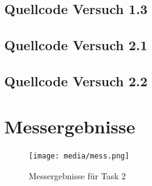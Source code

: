 \documentclass[12pt, oneside, a4paper, \docLanguage]{report}
\begin{document}
\subsection{Quellcode Versuch 1.3}
\label{chap:APPENDIX_SOURCECODE_V1.3}

\newpage
\subsection{Quellcode Versuch 2.1}
\label{chap:APPENDIX_SOURCECODE_V2.1}

\newpage
\subsection{Quellcode Versuch 2.2}
\label{chap:APPENDIX_SOURCECODE_V2.2}

\newpage
\section{Messergebnisse}
\label{chap:APPENDIX_MEASUREMENT_SOURCE}
\begin{figure}[H]
	\centering\small
	\texttt{[image: media/mess.png]}
	\caption{Messergebnisse für Task 2}
	\label{img:Messergebnisse für Task 2}
\end{figure}
%
%

\end{document}

